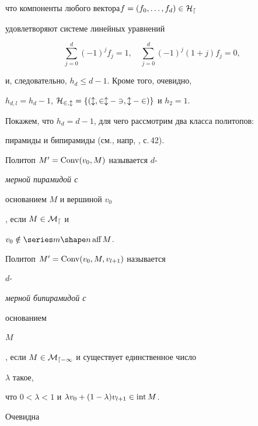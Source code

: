 что компоненты любого вектора\linebreak $f=(f_0,\dotsc,f_d)\in\cal H_d$


удовлетворяют системе линейных уравнений


\begin{equation}


\sum^d_{j=0}(-1)^j f_j=1,\quad


\sum^d_{j=0}(-1)^j(1+j)f_j=0,


\end{equation}


и, следовательно, $h_d\le d-1$. Кроме того, очевидно,


$h_{d,l}=h_d-1$, $\cal H_{2,l}=\{(l,2l-3,l-2)\}$ и $h_2=1$.





Покажем, что $h_d=d-1$, для чего рассмотрим два класса политопов:


пирамиды и бипирамиды (см., напр, \cite{Em}, с.\,42).





\begin{defn}


Политоп $M'=\operatorname{Conv}(v_0,M)$ называется $d$-{\em мерной пирамидой с


основанием $M$ и вершиной $v_0$}, если $M\in\cal M_d$ и


$v_0\notin\aff M$.


\end{defn}





\begin{defn}


Политоп $M'=\operatorname{Conv}(v_0,M,v_{l+1})$ называется


$d$-{\em мерной бипирамидой с


основанием


$M$}, если $M\in\cal M_{d-1}$ и существует единственное число


$\lambda$ такое,


что $0<\lambda<1$ и $\lambda v_0+(1-\lambda)v_{l+1}\in\operatorname{int} M$.


\end{defn}


\pagebreak





Очевидна





